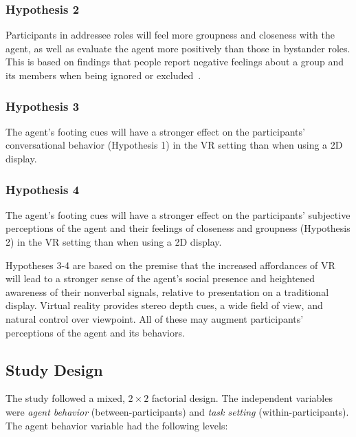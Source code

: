 \subsubsection{Hypothesis 2}

Participants in addressee roles will feel more groupness and closeness with the agent, as well as evaluate the agent more positively than those in bystander roles. This is based on findings that people report negative feelings about a group and its members when being ignored or excluded~\cite{geller1974being}.

\subsubsection{Hypothesis 3}

The agent's footing cues will have a stronger effect on the participants' conversational behavior (Hypothesis 1) in the VR setting than when using a 2D display.

\subsubsection{Hypothesis 4}

The agent's footing cues will have a stronger effect on the participants' subjective perceptions of the agent and their feelings of closeness and groupness (Hypothesis 2) in the VR setting than when using a 2D display.

Hypotheses 3-4 are based on the premise that the increased affordances of VR will lead to a stronger sense of the agent's social presence and heightened awareness of their nonverbal signals, relative to presentation on a traditional display. Virtual reality provides stereo depth cues, a wide field of view, and natural control over viewpoint. All of these may augment participants' perceptions of the agent and its behaviors.

\subsection{Study Design}

The study followed a mixed, $2 \times 2$ factorial design. The independent variables were \emph{agent behavior} (between-participants) and \emph{task setting} (within-participants). The agent behavior variable had the following levels:

